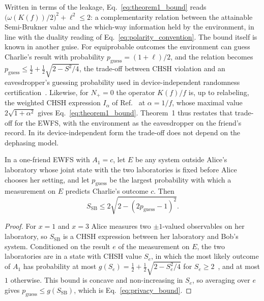 Written in terms of the leakage, Eq.~\eqref{eq:theorem1_bound} reads $\bigl(\omega(K(f))/2\bigr)^2 + \ell^2 \le 2$: a complementarity relation between the attainable Semi-Brukner value and the which-way information held by the environment, in line with the duality reading of Eq.~\eqref{eq:polarity_convention}. The bound itself is known in another guise. For equiprobable outcomes the environment can guess Charlie's result with probability $p_{\mathrm{guess}} = (1 + \ell)/2$, and the relation becomes $p_{\mathrm{guess}} \le \tfrac{1}{2} + \tfrac{1}{2}\sqrt{2 - S^2/4}$, the trade-off between CHSH violation and an eavesdropper's guessing probability used in device-independent randomness certification~\cite{pironio2010,masanes2011,acin2012}. Likewise, for $N_+ = 0$ the operator $K(f)/f$ is, up to relabeling, the weighted CHSH expression $I_\alpha$ of Ref.~\cite{acin2012} at $\alpha = 1/f$, whose maximal value $2\sqrt{1 + \alpha^2}$ gives Eq.~\eqref{eq:theorem1_bound}. Theorem~1 thus restates that trade-off for the EWFS, with the environment as the eavesdropper on the friend's record. In its device-independent form the trade-off does not depend on the dephasing model.

\begin{corollary}
\label{cor:privacy}
In a one-friend EWFS with $A_1 = c$, let $E$ be any system outside Alice's laboratory whose joint state with the two laboratories is fixed before Alice chooses her setting, and let $p_{\mathrm{guess}}$ be the largest probability with which a measurement on $E$ predicts Charlie's outcome $c$. Then
\begin{equation}
    S_{\mathrm{SB}} \le 2\sqrt{2 - (2p_{\mathrm{guess}} - 1)^2}.
    \label{eq:privacy_bound}
\end{equation}
\end{corollary}

\begin{proof}
For $x = 1$ and $x = 3$ Alice measures two $\pm 1$-valued observables on her laboratory, so $S_{\mathrm{SB}}$ is a CHSH expression between her laboratory and Bob's system. Conditioned on the result $e$ of the measurement on $E$, the two laboratories are in a state with CHSH value $S_e$, in which the most likely outcome of $A_1$ has probability at most $g(S_e) = \tfrac{1}{2} + \tfrac{1}{2}\sqrt{2 - S_e^2/4}$ for $S_e \ge 2$~\cite{pironio2010,masanes2011}, and at most $1$ otherwise. This bound is concave and non-increasing in $S_e$, so averaging over $e$ gives $p_{\mathrm{guess}} \le g(S_{\mathrm{SB}})$, which is Eq.~\eqref{eq:privacy_bound}.
\end{proof}

